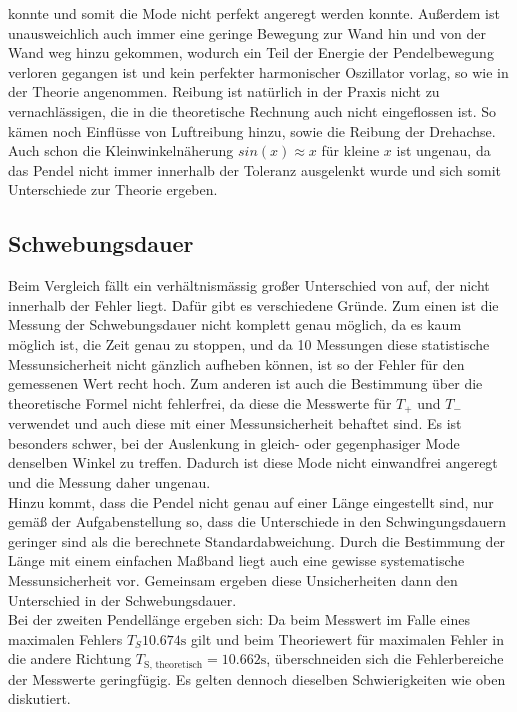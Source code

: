 konnte und somit die Mode nicht perfekt angeregt werden konnte. Außerdem ist unausweichlich auch immer eine geringe Bewegung zur Wand hin und von der Wand weg hinzu 
gekommen, wodurch ein Teil der Energie der Pendelbewegung verloren gegangen ist und kein perfekter harmonischer Oszillator vorlag, so wie in der Theorie
angenommen. Reibung ist natürlich in der Praxis nicht zu vernachlässigen, die in die theoretische Rechnung auch nicht eingeflossen ist. So kämen noch Einflüsse
von Luftreibung hinzu, sowie die Reibung der Drehachse.\\
Auch schon die Kleinwinkelnäherung $sin(x) \approx x$ für kleine $x$ ist ungenau, da das Pendel nicht immer innerhalb der Toleranz ausgelenkt wurde und sich somit
Unterschiede zur Theorie ergeben.

\subsection{Schwebungsdauer}
Beim Vergleich fällt ein verhältnismässig großer Unterschied von auf, der nicht innerhalb der Fehler liegt. 
Dafür gibt es verschiedene Gründe. Zum einen ist die Messung der Schwebungsdauer nicht komplett genau möglich, da es kaum möglich ist, die Zeit genau zu stoppen,
und da 10 Messungen diese statistische Messunsicherheit nicht gänzlich aufheben können, ist so der Fehler für den gemessenen Wert recht hoch.
Zum anderen ist auch die Bestimmung über die theoretische Formel nicht fehlerfrei, da diese die Messwerte für $T_{+}$ und $T_{-}$ verwendet und auch diese mit einer
Messunsicherheit behaftet sind. Es ist besonders schwer, bei der Auslenkung in gleich- oder gegenphasiger Mode denselben Winkel zu treffen. Dadurch ist diese Mode
nicht einwandfrei angeregt und die Messung daher ungenau.\\
Hinzu kommt, dass die Pendel nicht genau auf einer Länge eingestellt sind, nur gemäß der Aufgabenstellung so, dass die Unterschiede in den Schwingungsdauern geringer sind
als die berechnete Standardabweichung. Durch die Bestimmung der Länge mit einem einfachen Maßband liegt auch eine gewisse systematische Messunsicherheit vor.
Gemeinsam ergeben diese Unsicherheiten dann den Unterschied in der Schwebungsdauer.\\
Bei der zweiten Pendellänge ergeben sich:
Da beim Messwert im Falle eines maximalen Fehlers $T_{S}  10.674\si{\s}$ gilt und beim Theoriewert für maximalen Fehler in die andere Richtung 
$T_\text{S, theoretisch} = 10.662\si{\s}$, überschneiden sich die Fehlerbereiche der Messwerte geringfügig. Es gelten dennoch dieselben Schwierigkeiten wie oben 
diskutiert.


